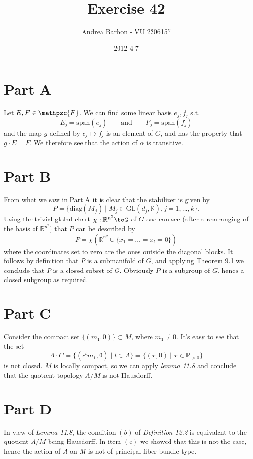 \documentclass[]{article}
\title{Exercise 42}
\author{ Andrea Barbon - VU 2206157 }
\date{2012-4-7}
\newcommand{\AND}{\qquad \text{and} \qquad}
\begin{document}
\ifpdf
{}
\else
{}
\fi

\maketitle

\section{Part A}
Let $E,F \in \mathpzc{F} $. We can find some linear basis $e_j,f_j$ s.t. 
$$ E_j = \text{span}(e_j) \AND F_j = \text{span}(f_j) $$
and the map $ g $ defined by $e_j \mapsto f_j$ is an element of $G$, and has the property that $ g\cdot E=F $. We therefore see that the action of $\alpha$ is transitive.

\section{Part B}
From what we saw in Part A it is clear that the stabilizer is given by $$ P=\{ \text{diag}(M_j) \mid M_j \in \text{GL}(d_j,\mathbb{K}), j=1,\dots,k \}. $$
Using the trivial global chart $\chi:\mathbb{R}^{n^2}\toG$ of $G$ one can see (after a rearranging of the basis of $\mathbb{R}^{n^2}$) that $P$ can be described by $$ P=\chi(\mathbb{R}^{n^2} \cup \{x_1=\dots=x_l=0\}) $$ where the coordinates set to zero are the ones outside the diagonal blocks. It follows by definition that $P$ is a submanifold of $G$, and applying Theorem 9.1 we conclude that $P$ is a closed subset of $G$. Obviously $P$ is a subgroup of $G$, hence a closed subgroup as required.


\section{Part C}
Consider the compact set $\{ (m_1, 0) \} \subset M $, where $m_1 \neq 0$. It's easy to see that the set $$ A \cdot C = \{(e^t m_1,0) \mid t\in A\} = \{(x,0) \mid x\in \mathbb{R}_{>0} \} $$ is not closed. $M$ is locally compact, so we can apply \emph{lemma 11.8} and conclude that the quotient topology $A / M$ is not Hausdorff.


\section{Part D}

In view of \emph{Lemma 11.8}, the condition $(b)$ of \emph{Definition 12.2} is equivalent to the quotient $A / M$ being Hausdorff. In item $(c)$ we showed that this is not the case, hence the action of $A$ on $M$ is not of principal fiber bundle type. 
\end{document}
